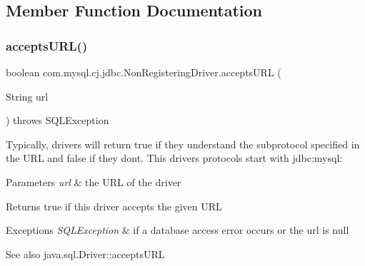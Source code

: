 \subsection{Member Function Documentation}
\mbox{\label{classcom_1_1mysql_1_1cj_1_1jdbc_1_1_non_registering_driver_a647f9685378b944a3c5c6d9f9c47d7f1}} 
\subsubsection{\texorpdfstring{accepts\+U\+R\+L()}{acceptsURL()}}
{\footnotesize\ttfamily boolean com.\+mysql.\+cj.\+jdbc.\+Non\+Registering\+Driver.\+accepts\+U\+RL (\begin{DoxyParamCaption}\item[{String}]{url }\end{DoxyParamCaption}) throws S\+Q\+L\+Exception}

Typically, drivers will return true if they understand the subprotocol specified in the U\+RL and false if they don\textquotesingle{}t. This driver\textquotesingle{}s protocols start with jdbc\+:mysql\+:


\begin{DoxyParams}{Parameters}
{\em url} & the U\+RL of the driver\\
\hline
\end{DoxyParams}
\begin{DoxyReturn}{Returns}
true if this driver accepts the given U\+RL
\end{DoxyReturn}

\begin{DoxyExceptions}{Exceptions}
{\em S\+Q\+L\+Exception} & if a database access error occurs or the url is null\\
\hline
\end{DoxyExceptions}
\begin{DoxySeeAlso}{See also}
java.\+sql.\+Driver\+::accepts\+U\+RL 
\end{DoxySeeAlso}
\mbox{\label{classcom_1_1mysql_1_1cj_1_1jdbc_1_1_non_registering_driver_ab3fd3d522550db032eab6c240b554e3e}} 
